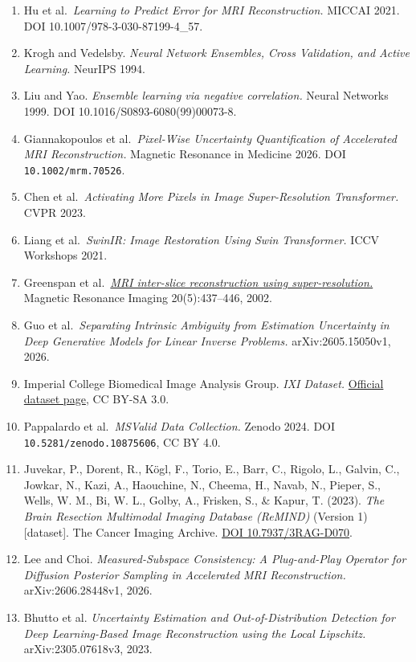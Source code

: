 \documentclass[
]{article}
\providecommand{\tightlist}{%
  \setlength{\itemsep}{0pt}\setlength{\parskip}{0pt}}
\begin{document}
\begingroup\fontsize{9}{10.5}\selectfont
\begin{enumerate}
\def\labelenumi{\arabic{enumi}.}
\tightlist
\item
  Hu et al.~\emph{Learning to Predict Error for MRI Reconstruction.}
  MICCAI 2021. DOI 10.1007/978-3-030-87199-4\_57.
\item
  Krogh and Vedelsby. \emph{Neural Network Ensembles, Cross Validation,
  and Active Learning.} NeurIPS 1994.
\item
  Liu and Yao. \emph{Ensemble learning via negative correlation.} Neural
  Networks 1999. DOI 10.1016/S0893-6080(99)00073-8.
\item
  Giannakopoulos et al.~\emph{Pixel-Wise Uncertainty Quantification of
  Accelerated MRI Reconstruction.} Magnetic Resonance in Medicine 2026.
  DOI \texttt{10.1002/mrm.70526}.
\item
  Chen et al.~\emph{Activating More Pixels in Image Super-Resolution
  Transformer.} CVPR 2023.
\item
  Liang et al.~\emph{SwinIR: Image Restoration Using Swin Transformer.}
  ICCV Workshops 2021.
\item
  Greenspan et
  al.~\href{https://doi.org/10.1016/S0730-725X(02)00511-8}{\emph{MRI
  inter-slice reconstruction using super-resolution.}} Magnetic
  Resonance Imaging 20(5):437--446, 2002.
\item
  Guo et al.~\emph{Separating Intrinsic Ambiguity from Estimation
  Uncertainty in Deep Generative Models for Linear Inverse Problems.}
  arXiv:2605.15050v1, 2026.
\item
  Imperial College Biomedical Image Analysis Group. \emph{IXI Dataset.}
  \href{https://brain-development.org/ixi-dataset/}{Official dataset
  page}, CC BY-SA 3.0.
\item
  Pappalardo et al.~\emph{MSValid Data Collection.} Zenodo 2024. DOI
  \texttt{10.5281/zenodo.10875606}, CC BY 4.0.
\item
  Juvekar, P., Dorent, R., Kögl, F., Torio, E., Barr, C., Rigolo, L.,
  Galvin, C., Jowkar, N., Kazi, A., Haouchine, N., Cheema, H., Navab,
  N., Pieper, S., Wells, W. M., Bi, W. L., Golby, A., Frisken, S., \&
  Kapur, T. (2023). \emph{The Brain Resection Multimodal Imaging Database
  (ReMIND)} (Version 1) {[}dataset{]}. The Cancer Imaging Archive.
  \href{https://doi.org/10.7937/3RAG-D070}{DOI
  10.7937/3RAG-D070}.
\item
  Lee and Choi. \emph{Measured-Subspace Consistency: A Plug-and-Play
  Operator for Diffusion Posterior Sampling in Accelerated MRI
  Reconstruction.} arXiv:2606.28448v1, 2026.
\item
  Bhutto et al. \emph{Uncertainty Estimation and Out-of-Distribution
  Detection for Deep Learning-Based Image Reconstruction using the Local
  Lipschitz.} arXiv:2305.07618v3, 2023.
\end{enumerate}
\endgroup
\end{document}
